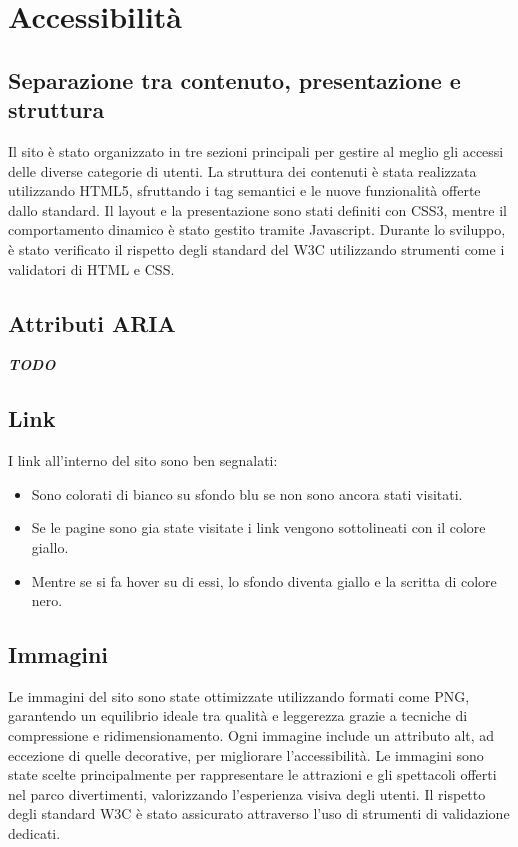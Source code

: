 \section{Accessibilità}
\subsection{Separazione tra contenuto, presentazione e struttura}
Il sito è stato organizzato in tre sezioni principali per gestire al meglio gli accessi delle diverse categorie di utenti. La struttura dei contenuti è stata realizzata utilizzando HTML5, sfruttando i tag semantici e le nuove funzionalità offerte dallo standard. Il layout e la presentazione sono stati definiti con CSS3, mentre il comportamento dinamico è stato gestito tramite Javascript. Durante lo sviluppo, è stato verificato il rispetto degli standard del W3C utilizzando strumenti come i validatori di HTML e CSS.
\subsection{Attributi ARIA}
\textbf{\textit{TODO}}
\subsection{Link}
I link all'interno del sito sono ben segnalati:
\begin{itemize}
    \item Sono colorati di bianco su sfondo blu se non sono ancora stati visitati.
    \item Se le pagine sono gia state visitate i link vengono sottolineati con il colore giallo.
    \item Mentre se si fa hover su di essi, lo sfondo diventa giallo e la scritta di colore nero.
\end{itemize}
\subsection{Immagini}
Le immagini del sito sono state ottimizzate utilizzando formati come PNG, garantendo un equilibrio ideale tra qualità e leggerezza grazie a tecniche di compressione e ridimensionamento. Ogni immagine include un attributo alt, ad eccezione di quelle decorative, per migliorare l’accessibilità. Le immagini sono state scelte principalmente per rappresentare le attrazioni e gli spettacoli offerti nel  parco divertimenti, valorizzando l’esperienza visiva degli utenti. Il rispetto degli standard W3C è stato assicurato attraverso l’uso di strumenti di validazione dedicati.
